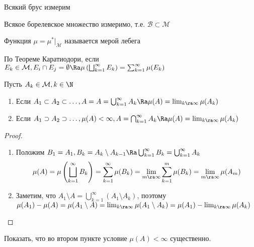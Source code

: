 \begin{corollary}
    Всякий брус измерим
\end{corollary}

\begin{corollary}
    Всякое борелевское множество измеримо, т.е. \(\mathcal{B} \subset \mathcal{M}\)
\end{corollary}

\begin{definition}
    Функция \(\mu = \mu^*|_{\mathcal{M}}\) называется мерой лебега
\end{definition}

\begin{note}
    По Теореме Каратиодори, если \(E_k \in \mathcal{M}, E_i \cap E_j = \emptyset \Ra \mu\left(\bigsqcup_{k = 1}^\infty E_k\right) = \sum_{k = 1}^\infty \mu(E_k)\)
\end{note}

\begin{theorem}
    Пусть \(A_k \in \mathcal{M}, k \in \N\)
    \begin{enumerate}
        \item Если \(A_1 \subset A_2 \subset \dots, A = A = \bigcup_{k = 1}^\infty A_k \Ra \mu(A) = \lim_{k \ra \infty} \mu(A_k)\)
        \item Если \(A_1 \supset A_2 \supset \dots, \mu(A) < \infty, A = \bigcap_{k = 1}^\infty A_k \Ra \mu(A) = \lim_{k \ra \infty} \mu(A_k)\)
    \end{enumerate}
\end{theorem}
\begin{proof}\indent
    \begin{enumerate}
        \item Положим \(B_1 = A_1, B_k = A_k \setminus A_{k - 1} \Ra \bigcup_{k = 1}^\infty B_k = \bigcup_{k = 1}^\infty A_k\)
        \[\mu(A) = \mu\left(\bigsqcup_{k = 1}^\infty B_k\right) = \sum_{k = 1}^\infty \mu(B_k) = \lim_{m \ra \infty} \sum_{k = 1}^m \mu(B_k) = \lim_{m \ra \infty} \mu(A_m)\]
        \item Заметим, что \(A_1 \setminus A = \bigcup_{k  =1}^\infty (A_1 \setminus A_k)\), поэтому \(\mu(A_1) - \mu(A) = \mu(A_1 \setminus A) = \lim_{k \ra \infty}\mu(A_1 \setminus A_k) = \mu(A_1) - \lim_{k \ra \infty} \mu(A_k)\)
    \end{enumerate}
\end{proof}

\begin{exercise}
    Показать, что во втором пункте условие \(\mu(A) < \infty\) существенно.
\end{exercise}

